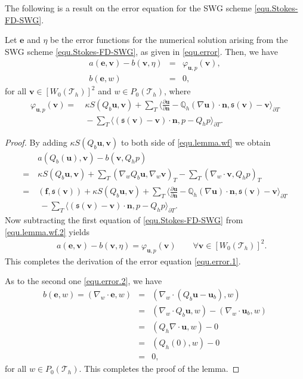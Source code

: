 \documentclass[final,leqno]{siamltex704}
\def\S{{\mathfrak s}}
\def\T{{\mathcal T}}
\begin{document}
The following is a result on the error equation for the SWG scheme \eqref{equ.Stokes-FD-SWG}.
\begin{lemma}
Let $\bm{e}$ and $\eta$ be the error functions for the numerical solution arising from the SWG scheme \eqref{equ.Stokes-FD-SWG}, as given in
\eqref{equ.error}. Then, we have
\begin{eqnarray}
a(\bm{e},\bm{v})-b(\bm{v},\eta) &=&\varphi_{\bm{u},p}(\bm{v}), \label{equ.error.1}\\
b(\bm{e},w)&=&0,\label{equ.error.2}
\end{eqnarray}
for all $\bm{v}\in [W_0(\T_h)]^2$ and $w \in P_0(\T_h)$, where
\begin{equation}\label{equ.error.3}
\begin{split}
\varphi_{\bm{u},p}(\bm{v}) =& \ \kappa {S}(Q_b\bm{u},\bm{v})
+ \sum_{T}\langle \frac{\partial \bm{u}}{\partial \bm{n}}- \mathbb{Q}_h(\nabla \bm{u})\cdot\bm{n},\S(\bm{v})-\bm{v}\rangle_{\partial T}\\
&\ - \sum_{T} \langle (\S(\bm{v})-\bm{v})\cdot \bm{n},p - Q_h p\rangle_{\partial T}.
\end{split}
\end{equation}
\end{lemma}
\begin{proof}
By adding $\kappa {S}(Q_b\bm{u},\bm{v})$ to both side of \eqref{equ.lemma.wf} we obtain
\begin{equation} \label{equ.lemma.wf.2}
\begin{split}
 & \ a(Q_b(\bm{u}),\bm{v}) - b(\bm{v},Q_h p)\\
 = & \ \kappa {S}(Q_b\bm{u},\bm{v})+\sum_{T}(\nabla_w Q_b \bm{u},\nabla_w \bm{v})_T - \sum_{T}(\nabla_w\cdot\bm{v}, Q_h p )_{T}\\
=& \ (\bm{f}, \S(\bm{v})) + \kappa {S}(Q_b\bm{u},\bm{v}) + \sum_{T}\langle \frac{\partial \bm{u}}{\partial \bm{n}}- \mathbb{Q}_h(\nabla \bm{u})\cdot\bm{n},\S(\bm{v})-\bm{v}\rangle_{\partial T}\\
&\ \ - \sum_{T} \langle (\S(\bm{v})-\bm{v})\cdot \bm{n},p - Q_h p\rangle_{\partial T}.
\end{split}
\end{equation}
Now subtracting the first equation of \eqref{equ.Stokes-FD-SWG} from  \eqref{equ.lemma.wf.2} yields
\begin{eqnarray*}
& & a(\bm{e},\bm{v})-b(\bm{v},\eta) =\varphi_{\bm{u},p}(\bm{v}) \qquad \forall \bm{v}\in [W_0(\T_h)]^2.
\end{eqnarray*}
This completes the derivation of the error equation \eqref{equ.error.1}.

As to the second one \eqref{equ.error.2}, we have
\begin{eqnarray*}
b(\bm{e},w)=(\nabla_w\cdot\bm{e},w)
&=&(\nabla_w\cdot(Q_b\bm{u}-\bm{u}_b),w)\\
&=&(\nabla_w\cdot Q_b\bm{u},w)-(\nabla_w\cdot\bm{u}_b,w) \nonumber\\
&=&(Q_h\nabla \cdot\bm{u},w)-0 \nonumber\\
&=&(Q_h (0),w)-0 \nonumber\\
&=&0,\nonumber
\end{eqnarray*}
for all $w \in P_0(\T_h)$. This completes the proof of the lemma.
\end{proof}
\end{document}
